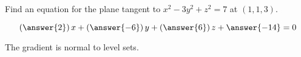 \documentclass{ximera}
\author{David Guichard \and Neal Koblitz \and H. Jerome Keisler \and Albert Scheller \and Barry Balof \and Mike Wills \and Matthew Carr \and Bart Snapp}
\begin{document}
\begin{exercise}
Find an equation for the plane tangent to $x^2-3y^2+z^2=7$ at $(1,1,3)$.

\begin{prompt}
\[
\left( \answer{2} \right) x  + \left( \answer{-6} \right)y + \left( \answer{6} \right) z+ \answer{-14}=0
\]
\end{prompt}
\begin{hint}
  The gradient is normal to level sets.
\end{hint}

\end{exercise}
\end{document}
